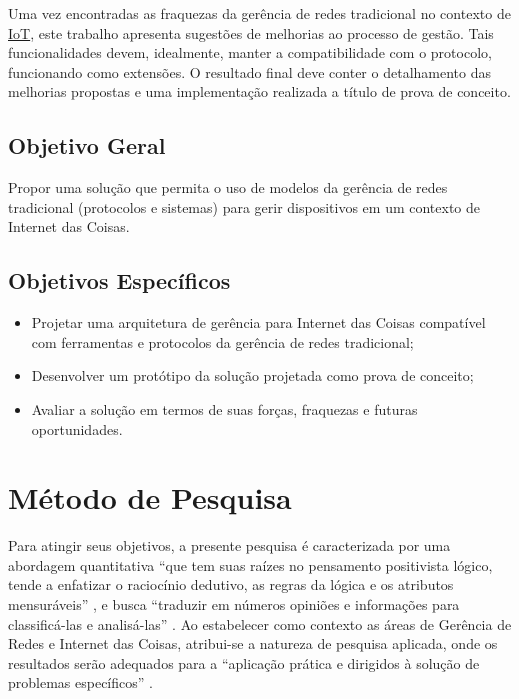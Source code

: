 \documentclass[twoside,english,brazilian]{UNISINOSmonografia}
\begin{document}
	Uma vez encontradas as fraquezas da gerência de redes tradicional no 
	contexto de \hyperref[siglas]{IoT}, este trabalho apresenta sugestões de melhorias ao 
	processo de gestão.
	Tais funcionalidades devem, idealmente, manter a compatibilidade com o 
	protocolo, funcionando como extensões. 
	O resultado final deve conter o detalhamento das melhorias propostas e uma 
	implementação realizada a título de prova de conceito.

\subsection{Objetivo Geral}

Propor uma solução que permita o uso de modelos da gerência de 
redes tradicional (protocolos e sistemas) para gerir dispositivos em um 
contexto de Internet das Coisas.

\subsection{Objetivos Específicos}
	\begin{itemize}
		\item
		Projetar uma arquitetura de gerência para Internet das Coisas 
		compatível com ferramentas e protocolos da gerência de redes 
		tradicional;
		
		\item
		Desenvolver um protótipo da solução projetada como prova de conceito;

		\item
		Avaliar a solução em termos de suas forças, fraquezas e futuras 
		oportunidades.
		
	\end{itemize}


\section{Método de Pesquisa}

Para atingir seus objetivos, a presente pesquisa é caracterizada por uma 
abordagem quantitativa 
``que tem suas raízes no pensamento positivista lógico, tende a enfatizar o 
raciocínio dedutivo, as regras da lógica e os atributos mensuráveis''
\cite[p.~33]{Gerhardt2009},
e busca
``traduzir em números opiniões e informações para classificá-las e 
analisá-las''
\cite[p.~20]{MetodologiaUFSC2005}.
Ao estabelecer como contexto as áreas de Gerência de Redes e Internet das 
Coisas, atribui-se a natureza de pesquisa aplicada, onde os resultados serão 
adequados para a
``aplicação prática e dirigidos à solução de problemas específicos''
\cite[p.~20]{MetodologiaUFSC2005}.
\end{document}
